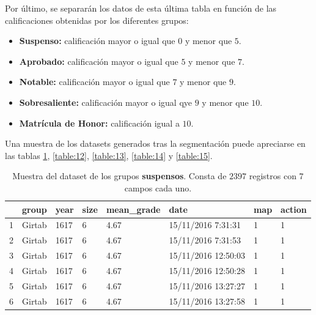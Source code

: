 Por último, se separarán los datos de esta última tabla en función de las calificaciones obtenidas por los diferentes grupos:
\begin{itemize}
	\item \textbf{Suspenso:} calificación mayor o igual que $0$ y menor que $5$.
	\item \textbf{Aprobado:} calificación mayor o igual que $5$ y menor que $7$.
	\item \textbf{Notable:} calificación mayor o igual que $7$ y menor que $9$.
	\item \textbf{Sobresaliente:} calificación mayor o igual qye $9$ y menor que $10$.
	\item \textbf{Matrícula de Honor:} calificación igual a $10$.
\end{itemize}

Una muestra de los datasets generados tras la segmentación puede apreciarse en las tablas \ref{table:11}, \ref{table:12}, \ref{table:13}, \ref{table:14} y \ref{table:15}.

\begin{table}[ht]
\centering
\begin{tabular}{rlllllll}
  \hline
 & group & year & size & mean\_grade & date & map & action \\ 
  \hline
1 & Girtab & 1617 & 6 & 4.67 & 15/11/2016 7:31:31  & 1 & 1 \\ 
  2 & Girtab & 1617 & 6 & 4.67 & 15/11/2016 7:31:53  & 1 & 1 \\ 
  3 & Girtab & 1617 & 6 & 4.67 & 15/11/2016 12:50:03 & 1 & 1 \\ 
  4 & Girtab & 1617 & 6 & 4.67 & 15/11/2016 12:50:28 & 1 & 1 \\ 
  5 & Girtab & 1617 & 6 & 4.67 & 15/11/2016 13:27:27 & 1 & 1 \\ 
  6 & Girtab & 1617 & 6 & 4.67 & 15/11/2016 13:27:58 & 1 & 1 \\ 
   \hline
\end{tabular}
\caption{Muestra del dataset de los grupos \textbf{suspensos}. Consta de $2397$ registros con $7$ campos cada uno.}
\label{table:11}
\end{table}

